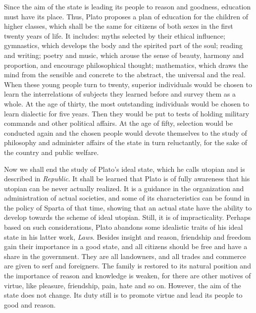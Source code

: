 \documentclass[11pt]{article}
\begin{document}
\begin{sloppypar}
Since the aim of the state is leading its people to reason and goodness, education must have its place. 
Thus, Plato proposes a plan of education for the children of higher classes, which shall be the same for citizens of both sexes in the first twenty years of life. 
It includes: 
myths selected by their ethical influence; 
gymnastics, which develops the body and the spirited part of the soul; 
reading and writing; 
poetry and music, which arouse the sense of beauty, harmony and proportion, and encourage philosophical thought; 
mathematics, which draws the mind from the sensible and concrete to the abstract, the universal and the real. 
When these young people turn to twenty, superior individuals would be chosen to learn the interrelations of subjects they learned before and survey them as a whole. 
At the age of thirty, the most outstanding individuals would be chosen to learn dialectic for five years. 
Then they would be put to tests of holding military commands and other political affairs. 
At the age of fifty, selection would be conducted again and the chosen people would devote themselves to the study of philosophy and administer affairs of the state in turn reluctantly, for the sake of the country and public welfare.

\newline

Now we shall end the study of Plato’s ideal state, which he calls utopian and is described in \textit{Republic}. 
It shall be learned that Plato is of fully awareness that his utopian can be never actually realized. 
It is a guidance in the organization and administration of actual societies, and some of its characteristics can be found in the policy of Sparta of that time, showing that an actual state have the ability to develop towards the scheme of ideal utopian. 
Still, it is of impracticality. 
Perhaps based on such considerations, Plato abandons some idealistic traits of his ideal state in his latter work, \textit{Laws}. 
Besides insight and reason, friendship and freedom gain their importance in a good state, and all citizens should be free and have a share in the government. 
They are all landowners, and all trades and commerce are given to serf and foreigners. 
The family is restored to its natural position and the importance of reason and knowledge is weaken, for there are other motives of virtue, like pleasure, friendship, pain, hate and so on. 
However, the aim of the state does not change. 
Its duty still is to promote virtue and lead its people to good and reason.
  

\end{sloppypar}
\end{document}
